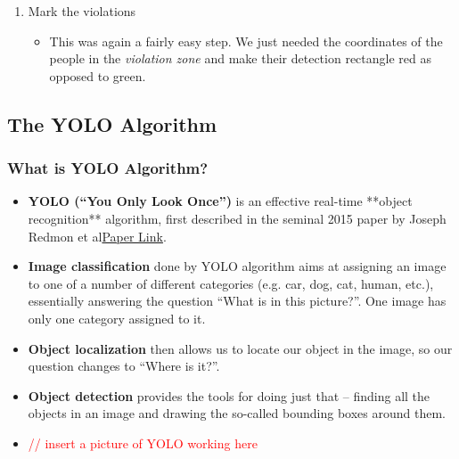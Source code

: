 \documentclass[a4paper]{article}
\begin{document}
\begin{enumerate}
    \item Mark the violations
          \begin{itemize}[label={}]
              \item This was again a fairly easy step. We just needed the coordinates of the people in the \textit{violation zone} and make their detection rectangle red as opposed to green.
          \end{itemize}
\end{enumerate}

\subsection{The YOLO Algorithm}

\subsubsection{What is YOLO Algorithm?}

\begin{itemize}
    \item \textbf{YOLO (“You Only Look Once”)} is an effective real-time **object recognition** algorithm, first described in the seminal 2015 paper by Joseph Redmon et al\textcolor{green}{\href{https://arxiv.org/abs/1804.02767}{Paper Link}}.
    \item \textbf{Image classification} done by YOLO algorithm aims at assigning an image to one of a number of different categories (e.g. car, dog, cat, human, etc.), essentially answering the question “What is in this picture?”. One image has only one category assigned to it.
    \item \textbf{Object localization} then allows us to locate our object in the image, so our question changes to “Where is it?”.
    \item \textbf{Object detection} provides the tools for doing just that –  finding all the objects in an image and drawing the so-called bounding boxes around them.
    \item \textcolor{red}{// insert a picture of YOLO working here}
\end{itemize}
\end{document}
